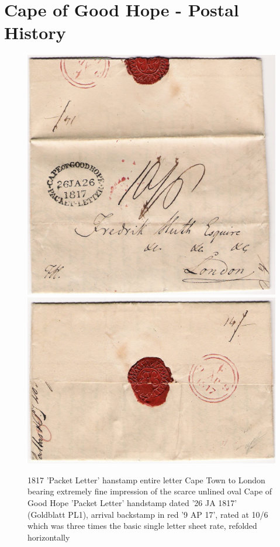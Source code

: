 \section{Cape of Good Hope - Postal History 
} 

\begin{figure}[htbp]
\includegraphics[width=.95\textwidth]{../cape-of-good-hope/Packet/PacketLetter.jpg}
\includegraphics[width=.95\textwidth]{../cape-of-good-hope/Packet/PacketLetterBackstamp.jpg}
\caption{
1817 'Packet Letter' hanstamp entire letter Cape Town to London bearing extremely fine impression of the scarce unlined oval Cape of Good Hope 'Packet Letter' handstamp dated '26 JA 1817' (Goldblatt PL1), arrival backstamp in red '9 AP 17', rated at 10/6 which was three times the basic single letter sheet rate, refolded horizontally
}
\end{figure}

